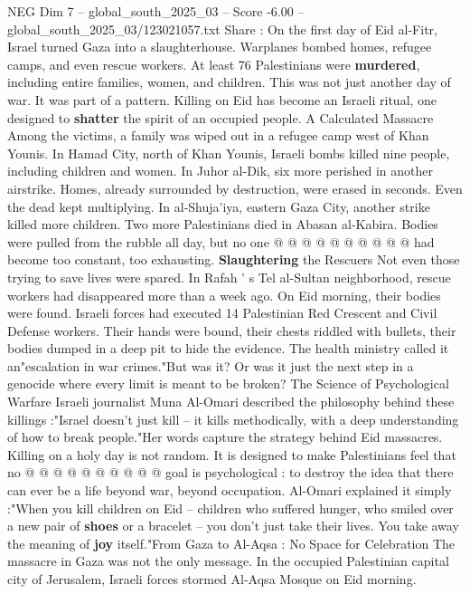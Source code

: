 \begin{textsample}{NEG Dim 7 – global\_south\_2025\_03 – Score -6.00 – global\_south\_2025\_03/123021057.txt}  \label{ex:f7_neg_351}
Share : On the first day of Eid al-Fitr, Israel turned Gaza into a slaughterhouse.
Warplanes bombed homes, refugee camps, and even rescue workers.
At least 76 Palestinians were \textbf{murdered}, including entire families, women, and children.
This was not just another day of war.
It was part of a pattern.
Killing on Eid has become an Israeli ritual, one designed to \textbf{shatter} the spirit of an occupied people.
A Calculated Massacre Among the victims, a family was wiped out in a refugee camp west of Khan Younis.
In Hamad City, north of Khan Younis, Israeli bombs killed nine people, including children and women.
In Juhor al-Dik, six more perished in another airstrike.
Homes, already surrounded by destruction, were erased in seconds.
Even the dead kept multiplying.
In al-Shuja'iya, eastern Gaza City, another strike killed more children.
Two more Palestinians died in Abasan al-Kabira.
Bodies were pulled from the rubble all day, but no one @ @ @ @ @ @ @ @ @ @ had become too constant, too exhausting. \textbf{Slaughtering} the Rescuers Not even those trying to save lives were spared.
In Rafah ' s Tel al-Sultan neighborhood, rescue workers had disappeared more than a week ago.
On Eid morning, their bodies were found.
Israeli forces had executed 14 Palestinian Red Crescent and Civil Defense workers.
Their hands were bound, their chests riddled with bullets, their bodies dumped in a deep pit to hide the evidence.
The health ministry called it an"escalation in war crimes."But was it?
Or was it just the next step in a genocide where every limit is meant to be broken?
The Science of Psychological Warfare Israeli journalist Muna Al-Omari described the philosophy behind these killings :"Israel doesn't just kill -- it kills methodically, with a deep understanding of how to break people."Her words capture the strategy behind Eid massacres.
Killing on a holy day is not random.
It is designed to make Palestinians feel that no @ @ @ @ @ @ @ @ @ @ goal is psychological : to destroy the idea that there can ever be a life beyond war, beyond occupation.
Al-Omari explained it simply :"When you kill children on Eid -- children who suffered hunger, who smiled over a new pair of \textbf{shoes} or a bracelet -- you don't just take their lives.
You take away the meaning of \textbf{joy} itself."From Gaza to Al-Aqsa : No Space for Celebration The massacre in Gaza was not the only message.
In the occupied Palestinian capital city of Jerusalem, Israeli forces stormed Al-Aqsa Mosque on Eid morning.

\end{textsample}
